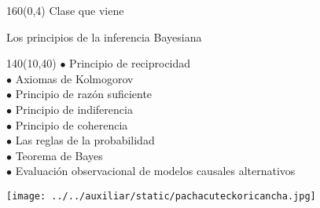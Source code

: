 \documentclass[shownotes,aspectratio=169]{beamer}
\begin{document}
\begin{frame}
\begin{textblock}{160}(0,4)
\LARGE \centering Clase que viene
\end{textblock} 
\vspace{1cm} \centering


\vspace{0.3cm}

\Large Los principios de la inferencia Bayesiana \\ \justify \large
\begin{textblock}{140}(10,40) 
$\bullet$ Principio de reciprocidad \\
$\bullet$ Axiomas de Kolmogorov \\
$\bullet$ Principio de razón suficiente \\
$\bullet$ Principio de indiferencia \\
$\bullet$ Principio de coherencia \\
$\bullet$ Las reglas de la probabilidad \\
$\bullet$ Teorema de Bayes \\
$\bullet$ Evaluación observacional de modelos causales alternativos \\
\end{textblock}

\end{frame}
 
\begin{frame}[plain]
\centering
  \texttt{[image: ../../auxiliar/static/pachacuteckoricancha.jpg]}
\end{frame}
\end{document}
